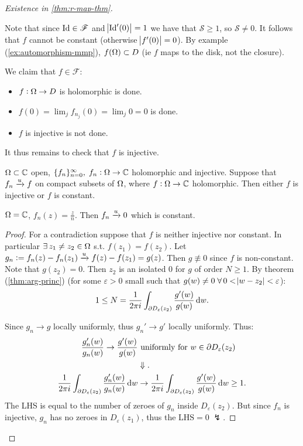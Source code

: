 \begin{proof}[Existence in \ref{thm:r-map-thm}]
\begin{enumerate}
Note that since $\mathrm{Id}  \in \mathscr{F}$ and $\abs{  \mathrm{Id} '(0)  } = 1$ we have that $\mathscr{S} \geq 1$, so $\mathscr{S} \neq 0$. It follows that $f$ cannot be constant (otherwise $\abs{f'(0)} =0$). By example (\ref{ex:automorphism-mmp}), $f(\Omega) \subset D$ (ie $f$ maps to the disk, not the closure).

We claim that $f \in \mathscr{F}$:
\begin{itemize}
    \item $f: \Omega \to D$ is holomorphic is done.
    \item $f(0) = \lim_j f_{n_j} (0) = \lim_j 0 = 0$ is done.
    \item $f$ is injective is not done.
\end{itemize}

It thus remains to check that $f$ is injective.

\begin{lemma}\label{lem:r-mapping-thm-lem}
$\Omega \subset \mathbb{C}$ open, $\{f_n\}_{n=0}^\infty, \; f_n : \Omega \to \mathbb{C}$ holomorphic and injective. Suppose that $f_n \xrightarrow[]{u} f$ on compact subsets of $\Omega$, where $f:\Omega \rightarrow \mathbb{C}$ holomorphic. Then either $f$ is injective or $f$ is constant.
\end{lemma}

\begin{example}
$\Omega = \mathbb{C}$, $f_n(z) = \frac{z}{n}$. Then $f_n \xrightarrow[]{u} 0$ which is constant.
\end{example}

\begin{proof}
For a contradiction suppose that $f$ is neither injective nor constant. In particular $\exists \, z_1 \neq z_2 \in \Omega$ s.t. $f(z_1) = f(z_2)$. Let $g_n \vcentcolon = f_n(z) - f_n(z_1) \xrightarrow[]{u} f(z) - f(z_1) = g(z)$. Then $g \nequiv 0$ since $f $ is non-constant. Note that $g(z_2) = 0$. Then $z_2$ is an isolated $0$ for $g$ of order $N \geq 1$. By theorem (\ref{thm:arg-princ}) (for some $\varepsilon>0$ small such that $g(w) \neq 0 \; \forall \, 0 < \abs{w - z_2} < \varepsilon$): %
\begin{align*}
    1 \leq N = \frac{1}{2 \pi i } \int_{\partial D_\varepsilon (z_2)} \frac{g'(w)}{g(w)} \dif w.
\end{align*}

Since $g_n \to g$ locally uniformly, thus $g_n' \to g'$ locally uniformly. Thus:
\begin{align*}
    \frac{g_n'(w)}{g_n(w)} \to \frac{g'(w)}{g(w)} &\text{ uniformly for $w \in \partial D_\varepsilon (z_2)$}\\
    &\Downarrow.\\
    \frac{1}{2 \pi i } \int_{\partial D_\varepsilon (z_2)} \frac{g_n'(w)}{g_n(w)} \dif w &\to \frac{1}{2 \pi i } \int_{\partial D_\varepsilon (z_2)} \frac{g'(w)}{g(w)} \dif w \geq 1.
\end{align*}
The LHS is equal to the number of zeroes of $g_n$ inside $D_\varepsilon (z_2)$. But since $f_n$ is injective, $g_n$ has no zeroes in $D_\varepsilon (z_1)$, thus the $\text{LHS} = 0 \; \lightning$.
\end{proof}


\end{enumerate}
\end{proof}
